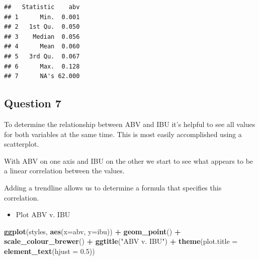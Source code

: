 \documentclass[]{article}
\newenvironment{Shaded}{\begin{snugshade}}{\end{snugshade}}
\newcommand{\KeywordTok}[1]{\textcolor[rgb]{0.13,0.29,0.53}{\textbf{#1}}}
\newcommand{\DataTypeTok}[1]{\textcolor[rgb]{0.13,0.29,0.53}{#1}}
\newcommand{\FloatTok}[1]{\textcolor[rgb]{0.00,0.00,0.81}{#1}}
\newcommand{\StringTok}[1]{\textcolor[rgb]{0.31,0.60,0.02}{#1}}
\newcommand{\CommentTok}[1]{\textcolor[rgb]{0.56,0.35,0.01}{\textit{#1}}}
\newcommand{\OperatorTok}[1]{\textcolor[rgb]{0.81,0.36,0.00}{\textbf{#1}}}
\newcommand{\NormalTok}[1]{#1}
\providecommand{\tightlist}{%
  \setlength{\itemsep}{0pt}\setlength{\parskip}{0pt}}
\begin{document}
\begin{verbatim}
##   Statistic    abv
## 1      Min.  0.001
## 2   1st Qu.  0.050
## 3    Median  0.056
## 4      Mean  0.060
## 5   3rd Qu.  0.067
## 6      Max.  0.128
## 7      NA's 62.000
\end{verbatim}

\subsection{Question 7}\label{question-7}

To determine the relationship between ABV and IBU it's helpful to see
all values for both variables at the same time. This is most easily
accomplished using a scatterplot.

With ABV on one axis and IBU on the other we start to see what appears
to be a linear correlation between the values.

Adding a trendline allows us to determine a formula that specifies this
correlation.

\begin{Shaded}
\end{Shaded}

\begin{itemize}
\tightlist
\item
  Plot ABV v. IBU
\end{itemize}

\begin{Shaded}
\begin{Highlighting}[]
\KeywordTok{ggplot}\NormalTok{(styles, }\KeywordTok{aes}\NormalTok{(}\DataTypeTok{x=}\NormalTok{abv, }\DataTypeTok{y=}\NormalTok{ibu)) }\OperatorTok{+}
\StringTok{  }\KeywordTok{geom_point}\NormalTok{() }\OperatorTok{+}
\StringTok{  }\KeywordTok{scale_colour_brewer}\NormalTok{() }\OperatorTok{+}
\StringTok{  }\KeywordTok{ggtitle}\NormalTok{(}\StringTok{"ABV v. IBU"}\NormalTok{) }\OperatorTok{+}
\StringTok{  }\KeywordTok{theme}\NormalTok{(}\DataTypeTok{plot.title =} \KeywordTok{element_text}\NormalTok{(}\DataTypeTok{hjust =} \FloatTok{0.5}\NormalTok{))}
\end{Highlighting}
\end{Shaded}
\end{document}
